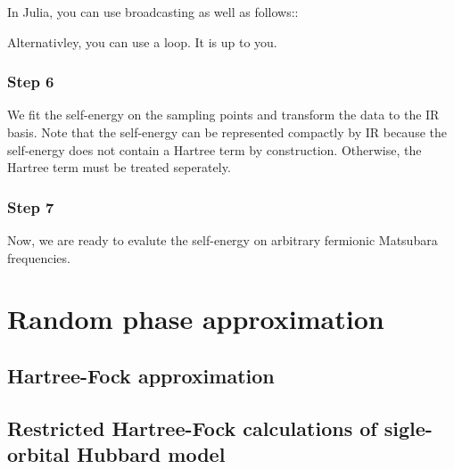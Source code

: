 \documentclass[submission, LectureNotes]{SciPost}
\newcommand{\wmax}{\ensuremath{{\omega_\mathrm{max}}}}
\newcommand\ii{\mathrm{i}}%
\newcommand{\hatFmat}{\hat{\mathbf{F}}}
\newcommand{\Fmat}{{\mathbf{F}}}
\begin{document}
In Julia, you can use broadcasting as well as follows::

Alternativley, you can use a loop. It is up to you.

\subsubsection{Step 6}
We fit the self-energy on the sampling points and transform the data to the IR basis.
Note that the self-energy can be represented compactly by IR because the self-energy does not contain a Hartree term by construction.
Otherwise, the Hartree term must be treated seperately.

\subsubsection{Step 7}
Now, we are ready to evalute the self-energy on arbitrary fermionic Matsubara frequencies.


%
%
%

\clearpage
\section{Random phase approximation}
\subsection{Hartree-Fock approximation}
\clearpage
\subsection{Restricted Hartree-Fock calculations of sigle-orbital Hubbard model}
\end{document}
